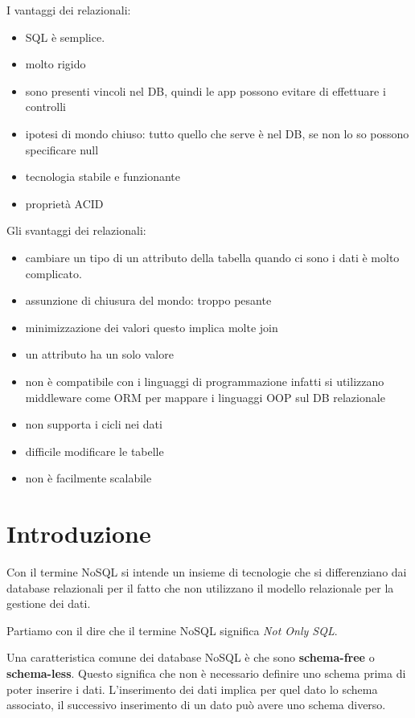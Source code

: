I vantaggi dei relazionali:
\begin{itemize}
    \item SQL è semplice.
    \item molto rigido
    \item sono presenti vincoli nel DB, quindi le app possono evitare di effettuare i controlli
    \item ipotesi di mondo chiuso: tutto quello che serve è nel DB, se non lo so possono
    specificare null
    \item tecnologia stabile e funzionante
    \item proprietà ACID
\end{itemize}
Gli svantaggi dei relazionali:
\begin{itemize}
    \item cambiare un tipo di un attributo della tabella quando ci sono i dati 
    è molto complicato.
    \item assunzione di chiusura del mondo: troppo pesante
    \item minimizzazione dei valori questo implica molte join
    \item un attributo ha un solo valore
    \item non è compatibile con i linguaggi di programmazione infatti si utilizzano
    middleware come ORM per mappare i linguaggi OOP sul DB relazionale
    \item non supporta i cicli nei dati
    \item difficile modificare le tabelle
    \item non è facilmente scalabile
\end{itemize}

\section{Introduzione}
Con il termine NoSQL si intende un insieme di tecnologie che si differenziano
dai database relazionali per il fatto che non utilizzano il modello relazionale
per la gestione dei dati.

Partiamo con il dire che il termine NoSQL significa \textit{Not Only SQL}.

Una caratteristica comune dei database NoSQL è che sono \textbf{schema-free} o
\textbf{schema-less}. Questo significa che non è necessario definire uno schema
prima di poter inserire i dati. L'inserimento dei dati implica per quel dato lo
schema associato, il successivo inserimento di un dato può avere uno schema diverso.

